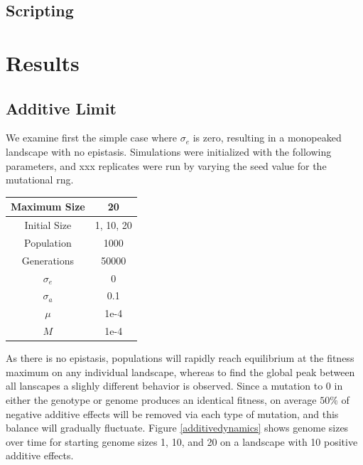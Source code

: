 \documentclass[paper=a4, fontsize=11pt,twoside]{scrartcl}       %
\begin{document}
\subsection*{Scripting}

\section*{Results}

\subsection*{Additive Limit}

We examine first the simple case where $\sigma_{e}$ is zero, resulting in a monopeaked landscape with no epistasis. Simulations were initialized with the following parameters, and xxx replicates were run by varying the seed value for the mutational rng.
\begin{center}
    \begin{tabular}{ | c | c | }
	\hline
	Maximum Size & 20 \\ \hline
	Initial Size & 1, 10, 20 \\ \hline
	Population & 1000 \\ \hline
	Generations & 50000 \\ \hline
	$\sigma_e$ & 0 \\ \hline
	$\sigma_a$ & 0.1 \\ \hline
	$\mu$  & 1e-4 \\ \hline
	$M$ & 1e-4 \\ \hline
    \end{tabular}
\end{center}

As there is no epistasis, populations will rapidly reach equilibrium at the fitness maximum on any individual landscape, whereas to find the global peak between all lanscapes a slighly different behavior is observed. Since a mutation to $0$ in either the genotype or genome produces an identical fitness, on average $50\%$ of negative additive effects will be removed via each type of mutation, and this balance will gradually fluctuate. Figure \ref{additivedynamics} shows genome sizes over time for starting genome sizes 1, 10, and 20 on a landscape with 10 positive additive effects. 
\end{document}
